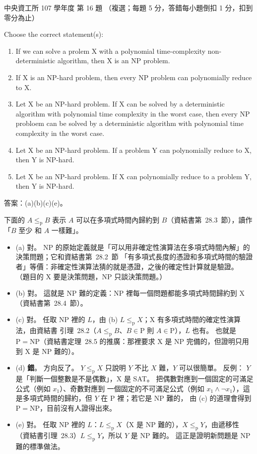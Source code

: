 \begin{pastexam}[label={px:ncu-107-dsa-16}]{中央資工所 107 學年度 第 16 題}
（複選；每題 5 分，答錯每小題倒扣 1 分，扣到零分為止）

Choose the correct statement(s):
\begin{enumerate}[label=(\alph*)]
\item If we can solve a prolem X with a polynomial time-complexity non-deterministic algorithm,
then X is an NP problem.
\item If X is an NP-hard problem, then every NP problem can polynomially reduce to X.
\item Let X be an NP-hard problem. If X can be solved by a deterministic algorithm with polynomial
time complexity in the worst case, then every NP probloem can be solved by a deterministic
algorithm with polynomial time complexity in the worst case.
\item Let X be an NP-hard problem. If a problem Y can polynomially reduce to X, then Y is NP-hard.
\item Let X be an NP-hard problem. If X can polynomially reduce to a problem Y, then Y is NP-hard.
\end{enumerate}
\end{pastexam}

\begin{pastsoln}
答案：(a)(b)(c)(e)。

下面的 $A \le_{\mathrm{p}} B$ 表示 $A$ 可以在多項式時間內歸約到 $B$（資結書第~28.3~節），讀作「$B$ 至少
和 $A$ 一樣難」。

\begin{itemize}
\item (a) 對。 NP 的原始定義就是「可以用非確定性演算法在多項式時間內解」的決策問題；它和資結書第~28.2~節
「有多項式長度的憑證和多項式時間的驗證者」等價：非確定性演算法猜的就是憑證，之後的確定性計算就是驗證。
（題目的 X 要是決策問題，NP 只談決策問題。）
\item (b) 對。 這就是 NP 難的定義：NP 裡每一個問題都能多項式時間歸約到 X（資結書第~28.4~節）。
\item (c) 對。 任取 NP 裡的 $L$，由 (b) $L \le_{\mathrm{p}} X$；X 有多項式時間的確定性演算法，由資結書
引理~28.2（$A \le_{\mathrm{p}} B$、$B \in \mathrm{P}$ 則 $A \in \mathrm{P}$），$L$ 也有。 也就是
$\mathrm{P} = \mathrm{NP}$（資結書定理~28.5 的推廣：那裡要求 X 是 NP 完備的，但證明只用到 X 是 NP 難的）。
\item (d) \textbf{錯}。 方向反了。 $Y \le_{\mathrm{p}} X$ 只說明 $Y$ 不比 $X$ 難，$Y$ 可以很簡單。 反例：
$Y$ 是「判斷一個整數是不是偶數」，X 是 SAT。 把偶數對應到一個固定的可滿足公式（例如 $x_1$）、奇數對應到
一個固定的不可滿足公式（例如 $x_1 \wedge \neg x_1$），這是多項式時間的歸約，但 $Y$ 在 P 裡；若它是 NP 難的，
由 (c) 的道理會得到 $\mathrm{P} = \mathrm{NP}$，目前沒有人證得出來。
\item (e) 對。 任取 NP 裡的 $L$：$L \le_{\mathrm{p}} X$（X 是 NP 難的），$X \le_{\mathrm{p}} Y$，由遞移性
（資結書引理~28.3）$L \le_{\mathrm{p}} Y$，所以 $Y$ 是 NP 難的。 這正是證明新問題是 NP 難的標準做法。
\end{itemize}
\end{pastsoln}
